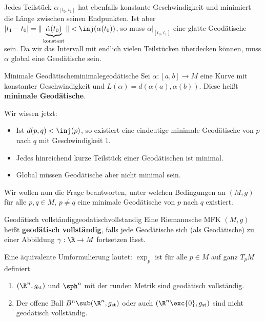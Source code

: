 \begin{beweis}
Jedes Teilstück $\alpha_[t_0, t_1]$ hat ebenfalls konstante Geschwindigkeit und minimiert die Länge zwischen seinen Endpunkten. Ist aber $|t_1-t_0| = \| \underbrace{ \dot{\alpha} (t_0)}_\text{konstant} \| < \inj (\alpha (t_0))$, so muss $\alpha|_{[t_0,t_1]}$ eine glatte Geodätische sein. Da wir das Intervall mit endlich vielen Teilstücken überdecken können, muss $\alpha$ global eine Geodätische sein.
\end{beweis}
\begin{definition}{Minimale Geodätische}{minimalegeodätische}
Sei $\alpha:[a,b] \to M$ eine Kurve mit konstanter Geschwindigkeit und $L(\alpha) = d(\alpha(a), \alpha(b))$. Diese heißt \textbf{minimale Geodätische}.
\end{definition}
Wir wissen jetzt:
\begin{itemize}
	\item Ist $d(p,q) < \inj (p)$, so existiert eine eindeutige minimale Geodätische von $p$ nach $q$ mit Geschwindigkeit $1$.
	\item Jedes hinreichend kurze Teilstück einer Geodätischen ist minimal.
	\item Global müssen Geodätische aber nicht minimal sein.
\end{itemize}
Wir wollen nun die Frage beantworten, unter welchen Bedingungen an $(M,g)$ für alle $p,q \in M$, $p \neq q$ eine minimale Geodätische von $p$ nach $q$ existiert.
\begin{definition}{Geodätisch vollständig}{geodatischvollstandig}
Eine Riemannsche MFK $(M,g)$ heißt \textbf{geodätisch vollständig}, falls jede Geodätische sich (als Geodätische) zu einer Abbildung $\gamma: \R \to M$ fortsetzen lässt.
\end{definition}
\begin{bemerkung}
Eine äquivalente Umformulierung lautet: $\exp_p$ ist für alle $p \in M$ auf ganz $T_pM$ definiert.
\end{bemerkung}
\begin{beispiele}
\begin{enumerate}
\item $(\R^n, g_\text{st})$ und $\sph^n$ mit der runden Metrik sind geodätisch vollständig.
\item Der offene Ball $B^n \sub (\R^n, g_\text{st})$ oder auch $(\R^n \exc \{ 0 \}, g_\text{st})$ sind nicht geodätisch vollständig.
\end{enumerate}
\end{beispiele}
